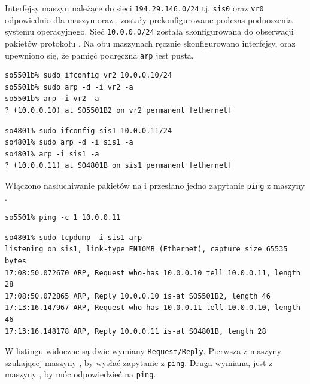 Interfejsy maszyn należące do sieci \texttt{194.29.146.0/24} tj. \texttt{sis0}
oraz \texttt{vr0} odpowiednio dla maszyn \tjz{} oraz \tjj, zostały
prekonfigurowane podczas podnoszenia systemu operacyjnego. Sieć
\texttt{10.0.0.0/24} została skonfigurowana do obserwacji pakietów protokołu
\arp. Na obu maszynach ręcznie skonfigurowano interfejsy, oraz upewniono się, że
pamięć podręczna \texttt{arp} jest pusta.

\begin{lstlisting}
so5501b% sudo ifconfig vr2 10.0.0.10/24
so5501b% sudo arp -d -i vr2 -a
so5501b% arp -i vr2 -a
? (10.0.0.10) at SO5501B2 on vr2 permanent [ethernet]
\end{lstlisting}

\begin{lstlisting}
so4801% sudo ifconfig sis1 10.0.0.11/24
so4801% sudo arp -d -i sis1 -a
so4801% arp -i sis1 -a
? (10.0.0.11) at SO4801B on sis1 permanent [ethernet]
\end{lstlisting}

Włączono nasłuchiwanie pakietów \arp{} na \tjj{} i przesłano jedno zapytanie
\texttt{ping} z maszyny \tjz.

\begin{lstlisting}
so5501% ping -c 1 10.0.0.11
\end{lstlisting}

\begin{lstlisting}
so4801% sudo tcpdump -i sis1 arp
listening on sis1, link-type EN10MB (Ethernet), capture size 65535 bytes
17:08:50.072670 ARP, Request who-has 10.0.0.10 tell 10.0.0.11, length 28
17:08:50.072865 ARP, Reply 10.0.0.10 is-at SO5501B2, length 46
17:13:16.147967 ARP, Request who-has 10.0.0.11 tell 10.0.0.10, length 46
17:13:16.148178 ARP, Reply 10.0.0.11 is-at SO4801B, length 28
\end{lstlisting}

W listingu widoczne są dwie wymiany \texttt{Request/Reply}. Pierwsza z maszyny
\tjz{} szukającej maszyny \tjj{}, by wysłać zapytanie z \texttt{ping}. Druga
wymiana, jest z maszyny \tjj{}, by móc odpowiedzieć na \texttt{ping}.
